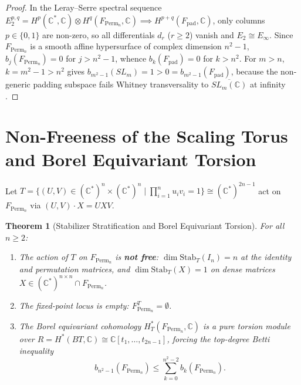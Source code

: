 \documentclass[11pt,a4paper]{article}
\newtheorem{theorem}{Theorem}[section]
\theoremstyle{definition}
\begin{document}
\begin{proof}
In the Leray--Serre spectral sequence $E_2^{p,q} = H^p(\mathbb{C}^*, \mathbb{C}) \otimes H^q(F_{\text{Perm}_n}, \mathbb{C}) \implies H^{p+q}(F_{\text{pad}}, \mathbb{C})$, only columns $p \in \{0, 1\}$ are non-zero, so all differentials $d_r$ ($r \ge 2$) vanish and $E_2 \cong E_\infty$. Since $F_{\text{Perm}_n}$ is a smooth affine hypersurface of complex dimension $n^2-1$, $b_j(F_{\text{Perm}_n}) = 0$ for $j > n^2-1$, whence $b_k(F_{\text{pad}}) = 0$ for $k > n^2$. For $m > n$, $k = m^2-1 > n^2$ gives $b_{m^2-1}(SL_m) = 1 > 0 = b_{m^2-1}(F_{\text{pad}})$, because the non-generic padding subspace fails Whitney transversality to $\overline{SL_m(\mathbb{C})}$ at infinity \cite{hamm83}.
\end{proof}

\section{Non-Freeness of the Scaling Torus and Borel Equivariant Torsion}

Let $T = \{(U, V) \in (\mathbb{C}^*)^n \times (\mathbb{C}^*)^n \mid \prod_{i=1}^n u_i v_i = 1\} \cong (\mathbb{C}^*)^{2n-1}$ act on $F_{\text{Perm}_n}$ via $(U, V) \cdot X = U X V$.

\begin{theorem}[Stabilizer Stratification and Borel Equivariant Torsion]
\label{thm:torus}
For all $n \ge 2$:
\begin{enumerate}
    \item The action of $T$ on $F_{\text{Perm}_n}$ is \textbf{not free}: $\dim \text{Stab}_T(I_n) = n$ at the identity and permutation matrices, and $\dim \text{Stab}_T(X) = 1$ on dense matrices $X \in (\mathbb{C}^*)^{n \times n} \cap F_{\text{Perm}_n}$.
    \item The fixed-point locus is empty: $F_{\text{Perm}_n}^T = \emptyset$.
    \item The Borel equivariant cohomology $H^*_T(F_{\text{Perm}_n}, \mathbb{C})$ is a pure torsion module over $R = H^*(BT, \mathbb{C}) \cong \mathbb{C}[t_1, \dots, t_{2n-1}]$, forcing the top-degree Betti inequality
    $$b_{n^2-1}(F_{\text{Perm}_n}) \le \sum_{k=0}^{n^2-2} b_k(F_{\text{Perm}_n}).$$
\end{enumerate}
\end{theorem}
\end{document}

